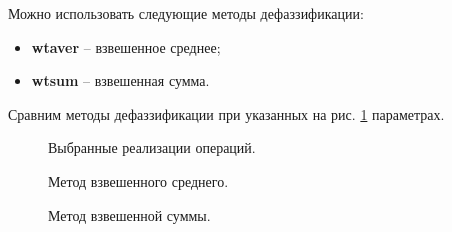 		Можно использовать следующие методы дефаззификации:
			\begin{itemize}
				\item \textbf{wtaver} – взвешенное среднее;
				\item \textbf{wtsum} – взвешенная сумма.
			\end{itemize}
		
	        Сравним методы дефаззификации при указанных на рис. \ref{sug_params} параметрах.
	        	\begin{figure}[h!]
	        	\caption{Выбранные реализации операций.}
	        	\label{sug_params}
	        \end{figure}
	        
			\begin{figure}[h!]
				\caption{Метод взвешенного среднего.}
			\end{figure}
			
			\begin{figure}[h!]
				\caption{Метод взвешенной суммы.}
			\end{figure}
		